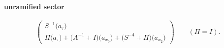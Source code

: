 \paragraph{unramified sector}
\[\begin{pmatrix}S^{-1}\bigl(a_{\tau}\bigr)\\\Pi\bigl(a_{\tau}\bigr)+\bigl(A^{-1}+I\bigr)\bigl(a_{x_{0}}\bigr)+\bigl(S^{-4}+\Pi\bigr)\bigl(a_{x_{2}}\bigr)\end{pmatrix}\qquad(\Pi=I).\]
